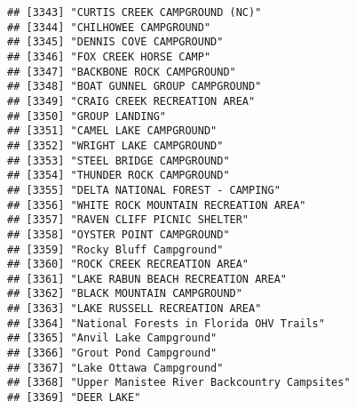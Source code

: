 \documentclass[
]{article}
\begin{document}
\begin{verbatim}
## [3343] "CURTIS CREEK CAMPGROUND (NC)"                                                        
## [3344] "CHILHOWEE CAMPGROUND"                                                                
## [3345] "DENNIS COVE CAMPGROUND"                                                              
## [3346] "FOX CREEK HORSE CAMP"                                                                
## [3347] "BACKBONE ROCK CAMPGROUND"                                                            
## [3348] "BOAT GUNNEL GROUP CAMPGROUND"                                                        
## [3349] "CRAIG CREEK RECREATION AREA"                                                         
## [3350] "GROUP LANDING"                                                                       
## [3351] "CAMEL LAKE CAMPGROUND"                                                               
## [3352] "WRIGHT LAKE CAMPGROUND"                                                              
## [3353] "STEEL BRIDGE CAMPGROUND"                                                             
## [3354] "THUNDER ROCK CAMPGROUND"                                                             
## [3355] "DELTA NATIONAL FOREST - CAMPING"                                                     
## [3356] "WHITE ROCK MOUNTAIN RECREATION AREA"                                                 
## [3357] "RAVEN CLIFF PICNIC SHELTER"                                                          
## [3358] "OYSTER POINT CAMPGROUND"                                                             
## [3359] "Rocky Bluff Campground"                                                              
## [3360] "ROCK CREEK RECREATION AREA"                                                          
## [3361] "LAKE RABUN BEACH RECREATION AREA"                                                    
## [3362] "BLACK MOUNTAIN CAMPGROUND"                                                           
## [3363] "LAKE RUSSELL RECREATION AREA"                                                        
## [3364] "National Forests in Florida OHV Trails"                                              
## [3365] "Anvil Lake Campground"                                                               
## [3366] "Grout Pond Campground"                                                               
## [3367] "Lake Ottawa Campground"                                                              
## [3368] "Upper Manistee River Backcountry Campsites"                                          
## [3369] "DEER LAKE"                                                                           

\end{verbatim}
\end{document}
